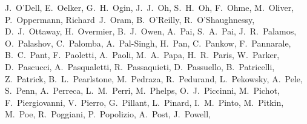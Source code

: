 {J.~O'Dell,  %
E.~Oelker,  %
G.~H.~Ogin,  %
J.~J.~Oh,  %
S.~H.~Oh,  %
F.~Ohme,  %
M.~Oliver,  %
P.~Oppermann,  %
Richard~J.~Oram,  %
B.~O'Reilly,  %
R.~O'Shaughnessy,  %
D.~J.~Ottaway,  %
H.~Overmier,  %
B.~J.~Owen,  %
A.~Pai,  %
S.~A.~Pai,  %
J.~R.~Palamos,  %
O.~Palashov,  %
C.~Palomba, %
A.~Pal-Singh,  %
H.~Pan,  %
C.~Pankow,  %
F.~Pannarale,  %
B.~C.~Pant,  %
F.~Paoletti, %
A.~Paoli, %
M.~A.~Papa,  %
H.~R.~Paris,  %
W.~Parker,  %
D.~Pascucci,  %
A.~Pasqualetti, %
R.~Passaquieti, %
D.~Passuello, %
B.~Patricelli, %
Z.~Patrick,  %
B.~L.~Pearlstone,  %
M.~Pedraza,  %
R.~Pedurand, %
L.~Pekowsky,  %
A.~Pele,  %
S.~Penn,  %
A.~Perreca,  %
L.~M.~Perri,  %
M.~Phelps,  %
O.~J.~Piccinni, %
M.~Pichot, %
F.~Piergiovanni, %
V.~Pierro,  %
G.~Pillant, %
L.~Pinard, %
I.~M.~Pinto,  %
M.~Pitkin,  %
M.~Poe,  %
R.~Poggiani, %
P.~Popolizio, %
A.~Post,  %
J.~Powell,  %
}
